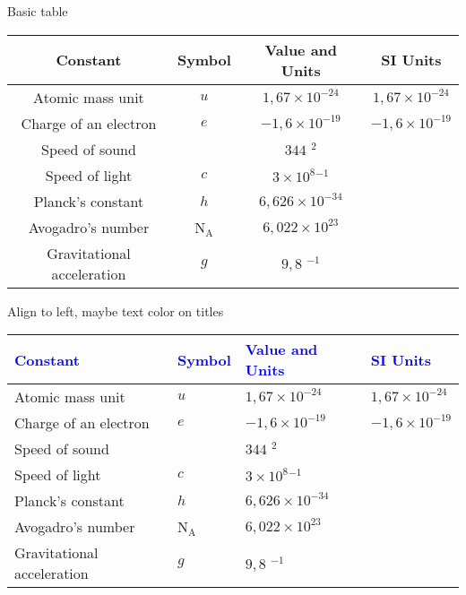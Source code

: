 \documentclass{article}		%
\begin{document}
Basic table

\vspace{0.5cm}		%
\begin{tabular}{|c|c|c|c|} \hline
	\textbf{Constant} 	 	 & Symbol		& \textbf{Value and Units} 					& \textbf{SI Units} \\ \hline		%
	Atomic mass unit 	 	 &  $u$     		& $1,67\times 10^{-24}$ \gram		 		& $1,67\times 10^{-24}$ \kilogram \\ \hline
	Charge of an electron 	 & $e$			& $-1,6\times 10^{-19}$ \coulomb 	 		& $-1,6\times 10^{-19}$ \ampere \cdot \second \\ \hline
	Speed of sound		 	 & 				& $344$ \meter	\cdot \second$^{2}$	 		& \\ \hline	
	Speed of light		 	 & $c$		 	& $3\times 10^{8}$\meter \cdot \second$^{-1}$ & \\ \hline
	Planck's constant	 	 & $h$			& $6,626\times 10^{-34}$\joule \cdot \second    & \\ \hline 
	Avogadro's number	 	 & N$_{\text{A}}$	& $6,022\times 10^{23}$				        & \\ \hline
	Gravitational acceleration	 & $g$			& $9,8$ \meter \cdot \second$^{-1}$			& \\ \hline
\end{tabular}

\vspace{0.5cm}	
Align to left, maybe text color on titles

\vspace{0.5cm}	
\begin{tabular}{| l | l | l | l |} \hline
	\textcolor{blue}{Constant} 	 	 & \textcolor{blue}{Symbol}		& \textcolor{blue}{Value and Units} 					& \textcolor{blue}{SI Units} \\ \hline		
	Atomic mass unit 	 	 &  $u$     		& $1,67\times 10^{-24}$ \gram		 	& $1,67\times 10^{-24}$ \kilogram \\ \hline
	Charge of an electron 	 & $e$			& $-1,6\times 10^{-19}$ \coulomb 	 		& $-1,6\times 10^{-19}$ \ampere \cdot \second \\ \hline
	Speed of sound		 	 & 				& $344$ \meter	\cdot \second$^{2}$	& \\ \hline	
	Speed of light		 	 & $c$		 	& $3\times 10^{8}$\meter \cdot \second$^{-1}$  	& \\ \hline
	Planck's constant	 	 & $h$			& $6,626\times 10^{-34}$\joule \cdot \second    & \\ \hline 
	Avogadro's number	 	 & N$_{\text{A}}$	& $6,022\times 10^{23}$				& \\ \hline
	Gravitational acceleration	 & $g$			& $9,8$ \meter \cdot \second$^{-1}$		& \\ \hline
\end{tabular}
\end{document}
